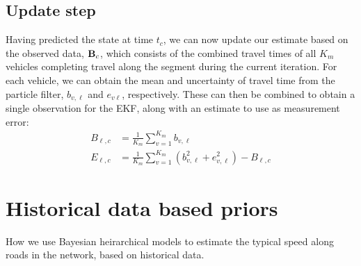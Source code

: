 \documentclass[english]{MastersDoctoralThesis}\usepackage[]{graphicx}\usepackage[]{color}
\begin{document}
\section{Update step}

Having predicted the state at time $t_c$,
we can now update our estimate based on the observed data,
$\mathbf{B}_c$, which consists of the combined travel times
of all $K_m$ vehicles completing travel along the segment
during the current iteration.
For each vehicle, we can obtain the mean and uncertainty
of travel time from the particle filter,
$b_{v,\ell}$ and $e_{v\ell}$, respectively.
These can then be combined to obtain a single observation for the EKF,
along with an estimate to use as measurement error:
\begin{align}
    \label{eq:kf_update_B}
    B_{\ell,c} &= \frac{1}{K_m} \sum_{v=1}^{K_m} b_{v,\ell} \\
    \label{eq:kf_update_E}
    E_{\ell,c} &= \frac{1}{K_m} \sum_{v=1}^{K_m}
        \left(b_{v,\ell}^2 + e_{v,\ell}^2\right) - B_{\ell,c}
\end{align}



\chapter{Historical data based priors}
\label{cha:historymodel}

How we use Bayesian heirarchical models to
estimate the typical speed along roads in the
network, based on historical data.


\appendix
\end{document}
